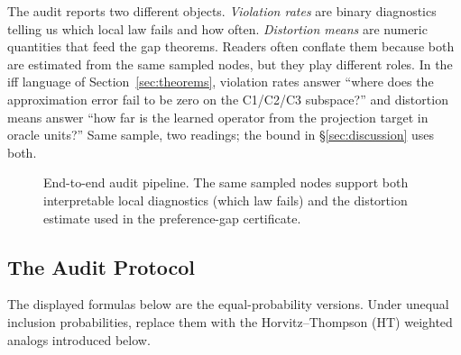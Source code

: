 The audit reports two different objects. \emph{Violation rates} are binary diagnostics telling us which local law fails and how often. \emph{Distortion means} are numeric quantities that feed the gap theorems. Readers often conflate them because both are estimated from the same sampled nodes, but they play different roles. In the iff language of Section~\ref{sec:theorems}, violation rates answer ``where does the approximation error fail to be zero on the C1/C2/C3 subspace?'' and distortion means answer ``how far is the learned operator from the projection target in oracle units?'' Same sample, two readings; the bound in \S\ref{sec:discussion} uses both.

\begin{figure}[t]
\centering
{}
\caption{End-to-end audit pipeline. The same sampled nodes support both interpretable local diagnostics (which law fails) and the distortion estimate used in the preference-gap certificate.}
\label{fig:audit-pipeline}
\end{figure}

\subsection{The Audit Protocol}

The displayed formulas below are the equal-probability versions. Under unequal inclusion probabilities, replace them with the Horvitz--Thompson (HT) weighted analogs introduced below.

